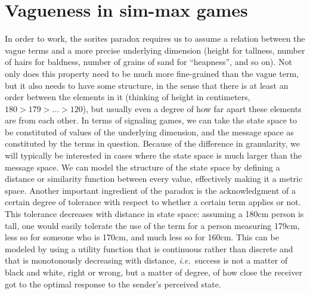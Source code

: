 \documentclass[a4paper]{article}
\begin{document}
\section{Vagueness in sim-max games}
\label{sec:sim-max-vagueness}

In order to work, the sorites paradox requires us to assume a relation between the vague terms and a more precise underlying dimension (height for tallness, number of hairs for baldness, number of grains of sand for ``heapness'', and so on).
Not only does this property need to be much more fine-grained than the vague term, but it also needs to have some structure, in the sense that there is at least an order between the elements in it (thinking of height in centimeters, $180 > 179 > \ldots > 120$), but usually even a degree of how far apart these elements are from each other.
In terms of signaling games, we can take the state space to be constituted of values of the underlying dimension, and the message space as constituted by the terms in question.
Because of the difference in granularity, we will typically be interested in cases where the state space is much larger than the message space.
We can model the structure of the state space by defining a distance or similarity function between every value, effectively making it a metric space.
Another important ingredient of the paradox is the acknowledgment of a certain degree of tolerance with respect to whether a certain term applies or not.
This tolerance decreases with distance in state space: assuming a 180cm person is tall, one would easily tolerate the use of the term for a person measuring 179cm, less so for someone who is 170cm, and much less so for 160cm.
This can be modeled by using a utility function that is continuous rather than discrete and that is monotonously decreasing with distance, \emph{i.e.}~success is not a matter of black and white, right or wrong, but a matter of degree, of how close the receiver got to the optimal response to the sender's perceived state.
\end{document}
